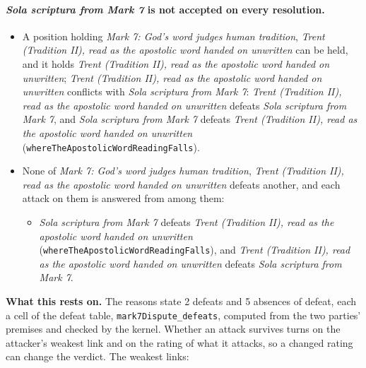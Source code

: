 \documentclass[11pt]{article}
\begin{document}
\paragraph{\emph{Sola scriptura from Mark 7} is not accepted on every resolution.}
\begin{itemize}
\item A position holding \emph{Mark 7: God’s word judges human tradition}, \emph{Trent (Tradition II), read as the apostolic word handed on unwritten} can be held, and it holds \emph{Trent (Tradition II), read as the apostolic word handed on unwritten}; \emph{Trent (Tradition II), read as the apostolic word handed on unwritten} conflicts with \emph{Sola scriptura from Mark 7}: \emph{Trent (Tradition II), read as the apostolic word handed on unwritten} defeats \emph{Sola scriptura from Mark 7}, and \emph{Sola scriptura from Mark 7} defeats \emph{Trent (Tradition II), read as the apostolic word handed on unwritten} (\texttt{where\allowbreak{}The\allowbreak{}Apostolic\allowbreak{}Word\allowbreak{}Reading\allowbreak{}Falls}).
\item None of \emph{Mark 7: God’s word judges human tradition}, \emph{Trent (Tradition II), read as the apostolic word handed on unwritten} defeats another, and each attack on them is answered from among them:
\begin{itemize}
\item \emph{Sola scriptura from Mark 7} defeats \emph{Trent (Tradition II), read as the apostolic word handed on unwritten} (\texttt{where\allowbreak{}The\allowbreak{}Apostolic\allowbreak{}Word\allowbreak{}Reading\allowbreak{}Falls}), and \emph{Trent (Tradition II), read as the apostolic word handed on unwritten} defeats \emph{Sola scriptura from Mark 7}.
\end{itemize}
\end{itemize}
\par\noindent\textbf{What this rests on.} The reasons state 2 defeats and 5 absences of defeat, each a cell of the defeat table, \texttt{mark7\allowbreak{}Dispute\_\allowbreak{}defeats}, computed from the two parties' premises and checked by the kernel. Whether an attack survives turns on the attacker's weakest link and on the rating of what it attacks, so a changed rating can change the verdict. The weakest links:
\end{document}
